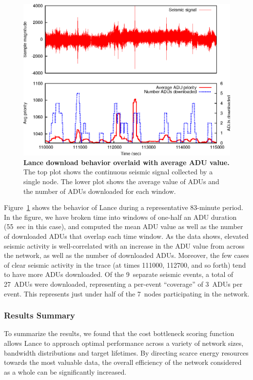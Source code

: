\begin{figure}[t]
\begin{center}
\includegraphics[width=1.0\hsize]{./figs/Sensys2008/2008-lance-download-behavior.eps}
\end{center}
\caption{{\bf Lance download behavior overlaid with average ADU value.}
The top plot shows the continuous seismic signal collected by a single node.
The lower plot shows the average value of ADUs and the number of ADUs
downloaded for each window.}
\label{fig-lance-download-behavior}
\end{figure}

Figure~\ref{fig-lance-download-behavior} shows the behavior of Lance during a
representative 83-minute period. In the figure, we have broken time into
windows of one-half an ADU duration (55~sec in this case), and computed the
mean ADU value as well as the number of downloaded ADUs that overlap each time
window. As the data shows, elevated seismic activity is well-correlated with
an increase in the ADU value from across the network, as well as the number of
downloaded ADUs.  Moreover, the few cases of clear seismic activity in the
trace (at times 111000, 112700, and so forth) tend to have more ADUs
downloaded. Of the 9~separate seismic events, a total of 27~ADUs were
downloaded, representing a per-event ``coverage'' of 3~ADUs per event.  This
represents just under half of the 7~nodes participating in the network.


\subsubsection{Results Summary}

To summarize the results, we found that the cost
bottleneck scoring function allows Lance to approach optimal performance
across a variety of network sizes, bandwidth distributions and target
lifetimes.  By directing scarce energy resources towards the most valuable
data, the overall efficiency of the network considered as a whole can be
significantly increased.
